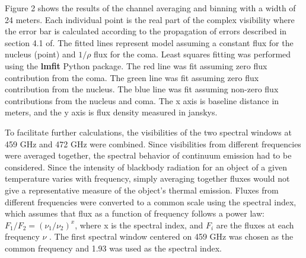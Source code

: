 Figure 2 shows the results of the channel averaging and binning with a width of 24 meters. Each individual point is the real part of the complex visibility where the error bar is calculated according to the propagation of errors described in section 4.1 of\cite{Nixon2020}. The fitted lines represent model assuming a constant flux for the nucleus (point) and \(1/\rho\) flux for the coma. Least squares fitting was performed using the \textbf{lmfit} Python package. The red line was fit assuming zero flux contribution from the coma. The green line was fit assuming zero flux contribution from the nucleus. The blue line was fit assuming non-zero flux contributions from the nucleus and coma. The x axis is baseline distance in meters, and the y axis is flux density measured in janskys.

To facilitate further calculations, the visibilities of the two spectral windows at 459 GHz and 472 GHz were combined. Since visibilities from different frequencies were averaged together, the spectral behavior of continuum emission had to be considered. Since the intensity of blackbody radiation for an object of a given temperature varies with frequency, simply averaging together fluxes would not give a representative measure of the object's thermal emission. Fluxes from different frequencies were converted to a common scale using the spectral index, which assumes that flux as a function of frequency follows a power law: \(F_{1}/F_{2} = {(\nu_{1}/\nu_{2})}^{x}\), where x is the spectral index, and \(F_{i}\) are the fluxes at each frequency \(\nu\) \citep{Lellouch2022}. The first spectral window centered on 459 GHz was chosen as the common frequency and 1.93 was used as the spectral index.

